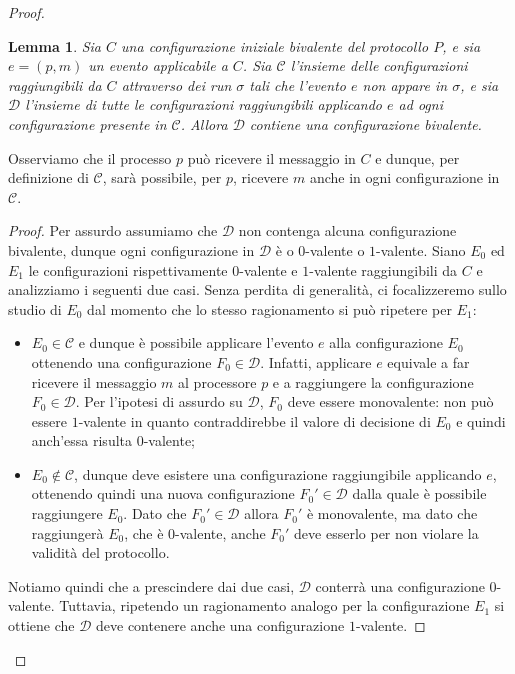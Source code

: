 \documentclass{article}
\newtheorem{lemma}{Lemma}
\begin{document}
\begin{proof}
\begin{lemma}
  Sia $C$ una configurazione iniziale bivalente del protocollo $P$, e
  sia $e=(p,m)$ un evento applicabile a $C$. Sia $\mathcal{C}$
  l'insieme delle configurazioni raggiungibili da $C$ attraverso dei
  run $\sigma$ tali che l'evento $e$ non appare in $\sigma$, e sia
  $\mathcal{D}$ l'insieme di tutte le configurazioni raggiungibili
  applicando $e$ ad ogni configurazione presente in
  $\mathcal{C}$. Allora $\mathcal{D}$ contiene una configurazione
  bivalente.
\end{lemma}
Osserviamo che il processo $p$ può ricevere il messaggio in $C$ e
dunque, per definizione di $\mathcal{C}$, sarà possibile, per $p$,
ricevere $m$ anche in ogni configurazione in $\mathcal{C}$.
\begin{proof}
  Per assurdo assumiamo che $\mathcal{D}$ non contenga alcuna
  configurazione bivalente, dunque ogni configurazione in
  $\mathcal{D}$ è o $0$-valente o $1$-valente. Siano $E_0$ ed $E_1$ le
  configurazioni rispettivamente $0$-valente e $1$-valente
  raggiungibili da $C$ e analizziamo i seguenti due casi. Senza
  perdita di generalità, ci focalizzeremo sullo studio di $E_0$ dal
  momento che lo stesso ragionamento si può ripetere per $E_1$:
\begin{itemize}
\item $E_0 \in \mathcal{C}$ e dunque è possibile applicare l'evento
  $e$ alla configurazione $E_0$ ottenendo una configurazione $F_0 \in
  \mathcal{D}$. Infatti, applicare $e$ equivale a far ricevere il
  messaggio $m$ al processore $p$ e a raggiungere la configurazione
  $F_0 \in \mathcal{D}$. Per l'ipotesi di assurdo su $\mathcal{D}$,
  $F_0$ deve essere monovalente: non può essere $1$-valente in quanto
  contraddirebbe il valore di decisione di $E_0$ e quindi anch'essa
  risulta $0$-valente;
\item $E_0 \not \in \mathcal{C}$, dunque deve esistere una
  configurazione raggiungibile applicando $e$, ottenendo quindi una
  nuova configurazione $F_0' \in \mathcal{D}$ dalla quale è possibile
  raggiungere $E_0$. Dato che $F_0' \in \mathcal{D}$ allora $F_0'$ \`e
  monovalente, ma dato che raggiunger\`a $E_0$, che è $0$-valente,
  anche $F_0'$ deve esserlo per non violare la validità del
  protocollo.
\end{itemize}
Notiamo quindi che a prescindere dai due casi, $\mathcal{D}$ conterrà
una configurazione $0$-valente. Tuttavia, ripetendo un ragionamento
analogo per la configurazione $E_1$ si ottiene che $\mathcal{D}$ deve
contenere anche una configurazione $1$-valente.


\end{proof}
\end{proof}
\end{document}
